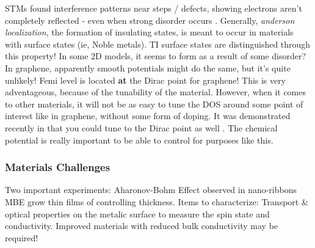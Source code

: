 \documentclass[../mattg_ti-fi_lit-review.tex]{subfiles}
\begin{document}
\begin{outline}
		\2 STMs found interference patterns near steps / defects, showing electrons aren't completely reflected - even when strong disorder occurs \cite{roushan_topological_2009,alpichshev_stm_2010, zhang_experimental_2009}. 
		\3 Generally, \textit{anderson localization}, the formation of insulating states, is meant to occur in materials with surface states (ie, Noble metals).
		\3 TI surface states are distinguished through this property! 
		\3 In some 2D models, it seems to form as a result of some disorder?
		\3 In graphene, apparently smooth potentials might do the same, but it's quite unlikely!
		\2 Femi level is located \textbf{at} the Dirac point for graphene! This is very adventageous, because of the tunability of the material. However, when it comes to other materials, it will not be as easy to tune the DOS around some point of interest like in graphene, without some form of doping. It was demonstrated recently in \bismuthselinide{} that you could tune to the Dirac point as well \cite{hsieh_tunable_2009}. The chemical potential is really important to be able to control for purposes like this. 	
		
	\end{outline}
	
	\subsubsection{Materials Challenges}
	\begin{outline}
		\1 Two important experiments:
		\2 Aharonov-Bohm Effect observed in nano-ribbons
		\2 MBE grow thin films of \bismuthselinide{} controlling thickness.
		\1 Items to characterize:
		\2 Transport \& optical properties on the metalic surface to measure the spin state and conductivity.
		\2 Improved materials with reduced bulk conductivity may be required!
	\end{outline}
	
\end{document}
